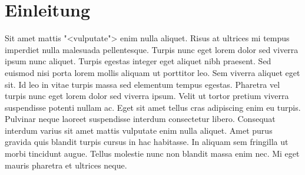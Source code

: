 \chapter{Einleitung}
Sit amet mattis "<vulputate"> enim nulla aliquet. Risus at ultrices mi tempus imperdiet nulla malesuada pellentesque. Turpis nunc eget lorem dolor sed viverra ipsum nunc aliquet. Turpis egestas integer eget aliquet nibh praesent. Sed euismod nisi porta lorem mollis aliquam ut porttitor leo. Sem viverra aliquet eget sit. Id leo in vitae turpis massa sed elementum tempus egestas. Pharetra vel turpis nunc eget lorem dolor sed viverra ipsum. Velit ut tortor pretium viverra suspendisse potenti nullam ac. Eget sit amet tellus cras adipiscing enim eu turpis. Pulvinar neque laoreet suspendisse interdum consectetur libero. Consequat interdum varius sit amet mattis vulputate enim nulla aliquet. Amet purus gravida quis blandit turpis cursus in hac habitasse. In aliquam sem fringilla ut morbi tincidunt augue. Tellus molestie nunc non blandit massa enim nec. Mi eget mauris pharetra et ultrices neque.